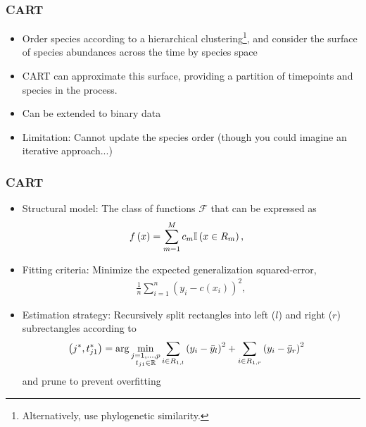 \documentclass{beamer}
\begin{document}
\begin{frame}
  \frametitle{CART}
  \begin{itemize}
  \item Order species according to a hierarchical
    clustering\footnote{Alternatively, use phylogenetic similarity.}, and
    consider the surface of species abundances across the time by species space
  \item CART can approximate this surface, providing a partition of timepoints
    and species in the process.
  \item Can be extended to binary data
  \item Limitation: Cannot update the species order (though you could imagine an
    iterative approach...)
  \end{itemize}  
\end{frame}

\begin{frame}
  \frametitle{CART}
\begin{itemize}
\item Structural model: The class of functions $\mathcal{F}$ that can be
  expressed as
\begin{align*}
  f\left(x\right) &= \sum_{m = 1}^{M} c_{m} \mathbb{I}\left({x \in R_{m}}\right),
\end{align*}
\item Fitting criteria: Minimize the expected generalization squared-error,
\begin{align*}
  \frac{1}{n} \sum_{i = 1}^{n} \left(y_{i} - c\left(x_{i}\right)\right)^{2},
\end{align*}
\item Estimation strategy: Recursively split rectangles into left ($l$) and
  right ($r$) subrectangles according to
\begin{align*}
  \left(j^{\ast}, t_{j1}^{\ast}\right) &= \arg \min_{\substack{j = 1, \dots, p \\ t_{j1} \in \mathbb{R}}} \sum_{i \in R_{1, l}} \left(y_{i} - \bar{y}_{l}\right)^{2} + \sum_{i \in R_{1, r}} \left(y_{i} - \bar{y}_{r}\right)^{2}
\end{align*}
and prune to prevent overfitting
\end{itemize}
\end{frame}
\end{document}
